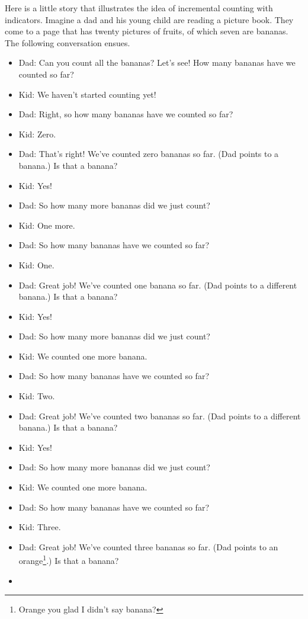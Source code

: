 \documentclass[
  letterpaper,
  DIV=11,
  numbers=noendperiod]{scrreprt}
\providecommand{\tightlist}{%
  \setlength{\itemsep}{0pt}\setlength{\parskip}{0pt}}
\theoremstyle{plain}
\theoremstyle{definition}
\theoremstyle{definition}
\theoremstyle{definition}
\theoremstyle{remark}
\begin{document}
Here is a little story that illustrates the idea of incremental counting
with indicators. Imagine a dad and his young child are reading a picture
book. They come to a page that has twenty pictures of fruits, of which
seven are bananas. The following conversation ensues.

\begin{itemize}
\tightlist
\item
  Dad: Can you count all the bananas? Let's see! How many bananas have
  we counted so far?
\item
  Kid: We haven't started counting yet!
\item
  Dad: Right, so how many bananas have we counted so far?
\item
  Kid: Zero.
\item
  Dad: That's right! We've counted zero bananas so far. (Dad points to a
  banana.) Is that a banana?
\item
  Kid: Yes!
\item
  Dad: So how many more bananas did we just count?
\item
  Kid: One more.
\item
  Dad: So how many bananas have we counted so far?
\item
  Kid: One.
\item
  Dad: Great job! We've counted one banana so far. (Dad points to a
  different banana.) Is that a banana?
\item
  Kid: Yes!
\item
  Dad: So how many more bananas did we just count?
\item
  Kid: We counted one more banana.
\item
  Dad: So how many bananas have we counted so far?
\item
  Kid: Two.
\item
  Dad: Great job! We've counted two bananas so far. (Dad points to a
  different banana.) Is that a banana?
\item
  Kid: Yes!
\item
  Dad: So how many more bananas did we just count?
\item
  Kid: We counted one more banana.
\item
  Dad: So how many bananas have we counted so far?
\item
  Kid: Three.
\item
  Dad: Great job! We've counted three bananas so far. (Dad points to an
  orange\footnote{Orange you glad I didn't say banana?}.) Is that a
  banana?
\item

\end{itemize}
\end{document}
